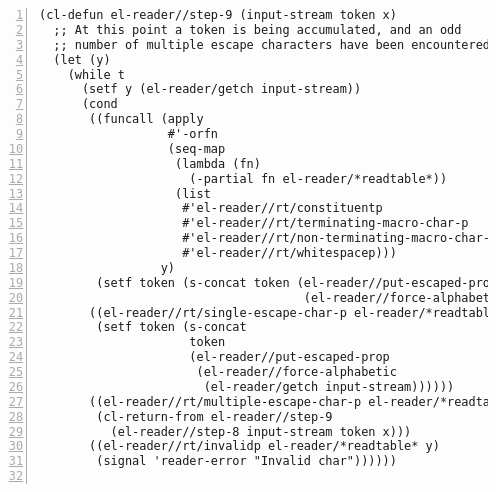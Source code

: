 \documentclass[a4paper,10pt,twoside]{report}
\begin{document}
\begin{lstlisting}[style=lispcode,label={code:read-algo},caption={Code for the
    reader algorithm.},numbers=left]
(cl-defun el-reader//step-9 (input-stream token x)
  ;; At this point a token is being accumulated, and an odd
  ;; number of multiple escape characters have been encountered.
  (let (y)
    (while t
      (setf y (el-reader/getch input-stream))
      (cond
       ((funcall (apply
                  #'-orfn
                  (seq-map
                   (lambda (fn)
                     (-partial fn el-reader/*readtable*))
                   (list
                    #'el-reader//rt/constituentp
                    #'el-reader//rt/terminating-macro-char-p
                    #'el-reader//rt/non-terminating-macro-char-p
                    #'el-reader//rt/whitespacep)))
                 y)
        (setf token (s-concat token (el-reader//put-escaped-prop
                                     (el-reader//force-alphabetic y)))))
       ((el-reader//rt/single-escape-char-p el-reader/*readtable* y)
        (setf token (s-concat
                     token
                     (el-reader//put-escaped-prop
                      (el-reader//force-alphabetic
                       (el-reader/getch input-stream))))))
       ((el-reader//rt/multiple-escape-char-p el-reader/*readtable* y)
        (cl-return-from el-reader//step-9
          (el-reader//step-8 input-stream token x)))
       ((el-reader//rt/invalidp el-reader/*readtable* y)
        (signal 'reader-error "Invalid char"))))))


\end{lstlisting}
\end{document}
